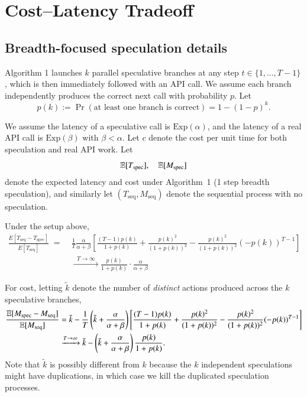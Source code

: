 \newpage 
\section{Cost--Latency Tradeoff}
\label{app:cost-latency}
\subsection{Breadth-focused speculation details}
Algorithm 1 launches $k$ parallel speculative branches at any step $t\in\{1,\dots,T-1\}$, which is then immediately followed  with an API call. We assume each branch independently produces the correct next call with probability $p$. Let
\[
p(k) := \Pr(\text{at least one branch is correct}) 
= 1 - (1-p)^k.
\]

We assume the latency of a speculative call is $\mathrm{Exp}(\alpha)$, and the latency of a real API call is $\mathrm{Exp}(\beta)$ with $\beta < \alpha$. Let $c$ denote the cost per unit time for both speculation and real API work. Let
\[
\mathbb{E}[T_{\mathrm{spec}}],\quad \mathbb{E}[M_{\mathrm{spec}}]
\]
denote the expected latency and cost under Algorithm~1 (1 step breadth speculation), and similarly let $(T_{\mathrm{seq}},M_{\mathrm{seq}})$ denote the sequential process with no speculation.

\vspace{3pt}
\begin{theorem}
\label{thm:cost-latency-tradeoff}
Under the setup above,
\begin{align*}
    \frac{E[T_{\mathrm{seq}} - T_{\mathrm{spec}}]}{E[T_{\mathrm{seq}}]}
    \;=\;&\frac{1}{T}\frac{\alpha}{\alpha+\beta}\left[\frac{(T-1)p(k)}{1+p(k)}+\frac{p(k)^2}{(1+p(k))^2} - \frac{p(k)^2}{(1+p(k))^2}(-p(k))^{T-1}\right]\\
    &\xrightarrow{\;\;T\to\infty\;\;}
    \frac{p(k)}{1+p(k)}\cdot\frac{\alpha}{\alpha+\beta}
\end{align*}

For cost, letting $\tilde{k}$ denote the number of \emph{distinct} actions produced across the $k$ speculative branches,
\begin{align*}
    \frac{\mathbb{E}[M_{\mathrm{spec}} - M_{\mathrm{seq}}]}{\mathbb{E}[M_{\mathrm{seq}}]}
    &=\tilde{k}
    -\frac{1}{T}\left(\tilde{k}+\frac{\alpha}{\alpha+\beta}\right)
    \left[
        \frac{(T-1)p(k)}{1+p(k)}
        +\frac{p(k)^2}{(1+p(k))^2}
        -\frac{p(k)^2}{(1+p(k))^2}(-p(k))^{T-1}
    \right]
    \\
    &\xrightarrow{T\to\infty}
    \tilde{k}
    -
    \left(\tilde{k}+\frac{\alpha}{\alpha+\beta}\right)
    \frac{p(k)}{1+p(k)}.
\end{align*}
Note that $\tilde{k}$ is possibly different from $k$ because the $k$ independent speculations might have duplications, in which case we kill the duplicated speculation processes.
\end{theorem}

